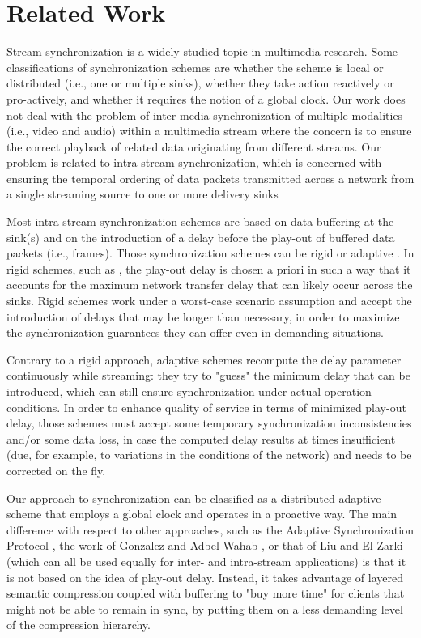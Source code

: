 \documentclass{sig-alternate}
\begin{document}
\section{Related Work} \label{related}
Stream synchronization is a widely studied topic in multimedia
research.  Some classifications of synchronization schemes are whether
the scheme is local or distributed (i.e., one or multiple sinks),
whether they take action reactively or pro-actively, and whether it
requires the notion of a global clock.  Our work does not deal with
the problem of inter-media synchronization of multiple modalities
(i.e., video and audio) within a multimedia stream where the concern
is to ensure the correct playback of related data originating from
different streams.  Our problem is related to intra-stream
synchronization, which is concerned with ensuring the temporal
ordering of data packets transmitted across a network from a single
streaming source to one or more delivery sinks

Most intra-stream synchronization schemes are based on data buffering
at the sink(s) and on the introduction of a delay before the play-out
of buffered data packets (i.e., frames).  Those synchronization
schemes can be rigid or adaptive \cite{Clark92}.  In rigid schemes,
such as \cite{Ferrari}, the play-out delay is chosen a priori in such
a way that it accounts for the maximum network transfer delay that can
likely occur across the sinks.  Rigid schemes work under a worst-case
scenario assumption and accept the introduction of delays that may be
longer than necessary, in order to maximize the synchronization
guarantees they can offer even in demanding situations.  

Contrary to a rigid approach, adaptive schemes \cite{ASP,Lancaster,FSP} 
recompute the delay parameter continuously while streaming: they
try to "guess" the minimum delay that can be introduced, which can
still ensure synchronization under actual operation conditions.  In
order to enhance quality of service in terms of minimized play-out
delay, those schemes must accept some temporary synchronization
inconsistencies and/or some data loss, in case the computed delay
results at times insufficient (due, for example, to variations in the
conditions of the network) and needs to be corrected on the fly.

Our approach to synchronization can be classified as a distributed
adaptive scheme that employs a global clock and operates in a
proactive way.  The main difference with respect to other approaches,
such as the Adaptive Synchronization Protocol \cite{ASP}, the work of
Gonzalez and Adbel-Wahab \cite{GONZALEZ}, or that of Liu and El
Zarki\cite{LIU} (which can all be used equally for inter- and
intra-stream applications) is that it is not based on the idea of
play-out delay.  Instead, it takes advantage of layered semantic
compression coupled with buffering to "buy more time" for clients that
might not be able to remain in sync, by putting them on a less
demanding level of the compression hierarchy.
\end{document}
